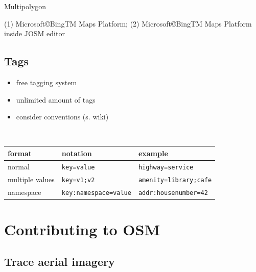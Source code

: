 \documentclass{beamer}
\begin{document}
\begin{frame}{Multipolygon}
\begin{center}
\begin{minipage}[b][0.6\textheight][c]{0.3\linewidth}
\begin{center}
				\end{center}
			\end{minipage}
		\end{center}
		{\tiny (1) Microsoft\copyright BingTM Maps Platform; (2) Microsoft\copyright BingTM Maps Platform inside JOSM editor}
	\end{frame}

	\subsection{Tags}
	
	\begin{frame}
		\begin{itemize}
			\item free tagging system
			\item unlimited amount of tags
			\item consider conventions (s. wiki)
		\end{itemize}
		\hfill\\\vspace{1cm}
		\begin{tabular}{|l|l|l|}
			\hline
			\textbf{format} & \textbf{notation} & \textbf{example} \\
			\hline
			normal & \texttt{key=value} & \texttt{highway=service} \\ 
			\hline 
			multiple values & \texttt{key=v1;v2} & \texttt{amenity=library;cafe} \\ 
			\hline 
			namespace & \texttt{key:namespace=value} & \texttt{addr:housenumber=42} \\ 
			\hline 
		\end{tabular}
	\end{frame}

	\section{Contributing to OSM}
	
	\subsection{Trace aerial imagery}
	
\end{document}
